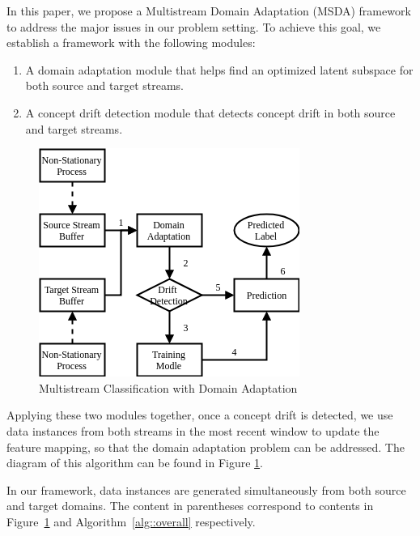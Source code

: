 In this paper, we propose a Multistream Domain Adaptation (MSDA) framework to address the major issues in our problem setting. 
To achieve this goal, we establish a framework with the following modules:

\begin{enumerate}
\item A domain adaptation module that helps find an optimized latent subspace for both source and target streams. 
\item A concept drift detection module that detects concept drift in both source and target streams.
\end{enumerate}

\begin{figure}[t]
\centering
\includegraphics[width=0.7\columnwidth]{Figures/flowchart.png}
\caption{Multistream Classification with Domain Adaptation}
\label{fig:flowchart}
\end{figure}

Applying these two modules together, once a concept drift is detected, we use data instances from both streams in the most recent window to update the feature mapping, so that the domain adaptation problem can be addressed. The diagram of this algorithm can be found in Figure \ref{fig:flowchart}.

In our framework, data instances are generated simultaneously from both source and target domains. The content in parentheses correspond to contents in Figure~\ref{fig:flowchart} and Algorithm~\ref{alg::overall} respectively.

